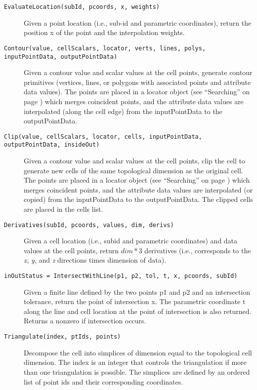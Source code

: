 \begin{description}
\begin{description}
    \item[\texttt{EvaluateLocation(subId, pcoords, x, weights)}]
    Given a point location (i.e., sub-id and parametric coordinates), return the position x of the point and the interpolation weights.

    \item[\texttt{Contour(value, cellScalars, locator, verts, lines, polys, inputPointData, outputPointData)}]
    Given a contour value and scalar values at the cell points, generate contour primitives (vertices, lines, or polygons with associated points and attribute data values). The points are placed in a locator object (see ``Searching'' on page \pageref{subsec:searching}) which merges coincident points, and the attribute data values are interpolated (along the cell edge) from the inputPointData to the outputPointData.

    \item[\texttt{Clip(value, cellScalars, locator, cells, inputPointData, outputPointData, insideOut)}]
    Given a contour value and scalar values at the cell points, clip the cell to generate new cells of the same topological dimension as the original cell. The points are placed in a locator object (see ``Searching'' on page \pageref{subsec:searching}) which merges coincident points, and the attribute data values are interpolated (or copied) from the inputPointData to the outputPointData. The clipped cells are placed in the cells list.

    \item[\texttt{Derivatives(subId, pcoords, values, dim, derivs)}]
    Given a cell location (i.e., subid and parametric coordinates) and data values at the cell points, return $dim*3$ derivatives (i.e., corresponds to the \emph{x}, \emph{y}, and \emph{z} directions times dimension of data).

    \item[\texttt{inOutStatus = IntersectWithLine(p1, p2, tol, t, x, pcoords, subId)}] 
    Given a finite line defined by the two points p1 and p2 and an intersection tolerance, return the point of intersection x. The parametric coordinate t along the line and cell location at the point of intersection is also returned. Returns a nonzero if intersection occurs.

    \item[\texttt{Triangulate(index, ptIds, points)}]
    Decompose the cell into simplices of dimension equal to the topological cell dimension. The index is an integer that controls the triangulation if more than one triangulation  is possible. The simplices are defined by an ordered list of point ids and their corresponding coordinates.


\end{description}
\end{description}
